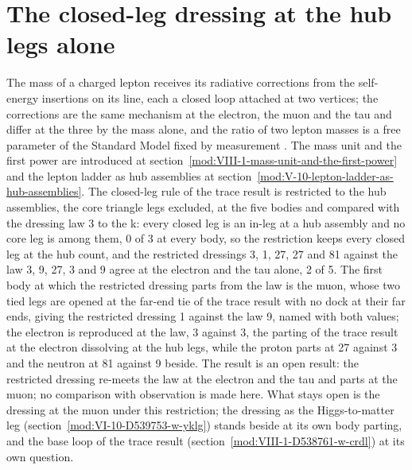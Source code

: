 \section{The closed-leg dressing at the hub legs alone}\label{mod:VIII-1-D539465-w-lhlc}
The mass of a charged lepton receives its radiative corrections from the self-energy insertions on its line, each a closed loop attached at two vertices; the corrections are the same mechanism at the electron, the muon and the tau and differ at the three by the mass alone, and the ratio of two lepton masses is a free parameter of the Standard Model fixed by measurement \cite{Dyson1949,Peskin1995}. The mass unit and the first power are introduced at section~\ref{mod:VIII-1-mass-unit-and-the-first-power} and the lepton ladder as hub assemblies at section~\ref{mod:V-10-lepton-ladder-as-hub-assemblies}.
The closed-leg rule of the trace result is restricted to the hub assemblies, the core triangle legs excluded, at the five bodies and compared with the dressing law 3 to the k: every closed leg is an in-leg at a hub assembly and no core leg is among them, 0 of 3 at every body, so the restriction keeps every closed leg at the hub count, and the restricted dressings 3, 1, 27, 27 and 81 against the law 3, 9, 27, 3 and 9 agree at the electron and the tau alone, 2 of 5.
The first body at which the restricted dressing parts from the law is the muon, whose two tied legs are opened at the far-end tie of the trace result with no dock at their far ends, giving the restricted dressing 1 against the law 9, named with both values; the electron is reproduced at the law, 3 against 3, the parting of the trace result at the electron dissolving at the hub legs, while the proton parts at 27 against 3 and the neutron at 81 against 9 beside.
The result is an open result: the restricted dressing re-meets the law at the electron and the tau and parts at the muon; no comparison with observation is made here.
What stays open is the dressing at the muon under this restriction; the dressing as the Higgs-to-matter leg (section~\ref{mod:VI-10-D539753-w-yklg}) stands beside at its own body parting, and the base loop of the trace result (section~\ref{mod:VIII-1-D538761-w-crdl}) at its own question.
